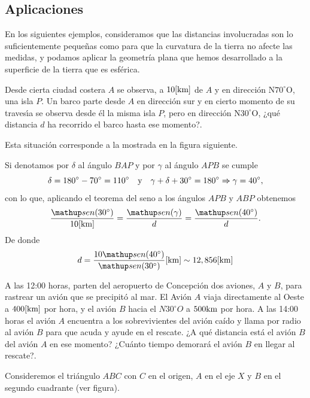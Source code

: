 \subsection{Aplicaciones}

En los siguientes ejemplos, consideramos que las distancias involucradas son lo suficientemente pequeñas como para que la curvatura de la tierra no afecte las medidas, y podamos aplicar la geometría plana que hemos desarrollado a la superficie de la tierra que es esférica.

\begin{ejemplo}
Desde cierta ciudad costera $A$ se observa, a $10[\textup{km}]$ de $A$ y en direcci\'on N$70^\circ$O, una isla $P$.
Un barco parte desde $A$ en direcci\'on sur y en cierto momento de su traves\'{\i}a se observa desde \'el la misma isla $P$, pero en direcci\'on N$30^\circ$O, ¿qu\'e distancia $d$ ha recorrido el barco hasta ese momento?.
\end{ejemplo}
	
Esta situaci\'on corresponde a la mostrada en la figura siguiente.
\begin{center}
\end{center}

				
		
		Si denotamos por $\delta$ al \'angulo $BAP$ y por $\gamma$ al \'angulo
		$APB$ se cumple 
		$$\delta = 180^\circ- 70^\circ=110^\circ\quad\textup{y}\quad \gamma + \delta +30^\circ =180^\circ
		\Rightarrow \gamma = 40^\circ,$$
		 con lo que, aplicando el teorema del seno a los ángulos $APB$ y $ABP$ obtenemos
		\[
			\frac{\sen(30^\circ)}{10[\textup{km}]}=\frac{\sen(\gamma)}{d}=\frac{\sen(40^\circ)}{d}.
		\]		
		De donde 
		$$ d=\frac{10\sen(40^\circ)}{\sen(30^\circ)}[\textup{km}]\sim 12,856[\textup{km}]$$
		
		


\begin{ejemplo}
A las 12:00 horas, parten del aeropuerto de Concepci\'on  dos aviones, $A$ y $B$, para rastrear un avi\'on que se precipit\'o al mar.
El Avi\'on $A$ viaja directamente al Oeste a $400[\textup{km}]$ por hora, y el avi\'on $B$ hacia el $N30^{\circ}O$ a $500\textup{km}$ por hora.
A las 14:00 horas el avi\'on $A$ encuentra a los sobrevivientes del avi\'on ca\'ido y llama por radio al avi\'on $B$ para que acuda y ayude en el rescate.
¿A qu\'e distancia est\'a el avi\'on $B$ del avi\'on $A$ en ese momento? 
¿Cu\'anto tiempo demorar\'a el avi\'on $B$ en llegar al rescate?.
\end{ejemplo}	
Consideremos el tri\'angulo $ABC$ con $C$ en el origen, $A$ en el eje 
$X$ y $B$ en el segundo cuadrante (ver figura). 


